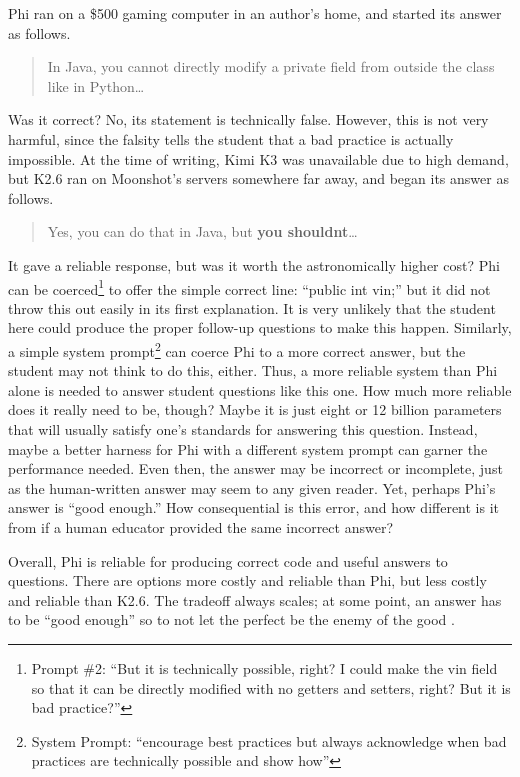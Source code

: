 Phi ran on a \$500 gaming computer in an author's home, and started its answer as follows.

\begin{quote}
In Java, you cannot directly modify a private field from outside the class like in Python\ldots{}
\end{quote}

Was it correct? No, its statement is technically false. However, this is not very harmful, since the falsity tells the student that a bad practice is actually impossible. At the time of writing, Kimi K3 was unavailable due to high demand, but K2.6 ran on Moonshot's servers somewhere far away, and began its answer as follows.

\begin{quote}
Yes, you can do that in Java, but \textbf{you shouldn\textquotesingle t}\ldots{}
\end{quote}

It gave a reliable response, but was it worth the astronomically higher cost? Phi can be coerced\footnote{Prompt \#2: ``But it is technically possible, right? I could make the vin field so that it can be directly modified with no getters and setters, right? But it is bad practice?''} to offer the simple correct line: ``public int vin;'' but it did not throw this out easily in its first explanation. It is very unlikely that the student here could produce the proper follow-up questions to make this happen. Similarly, a simple system prompt\footnote{System Prompt: ``encourage best practices but always acknowledge when bad practices are technically possible and show how''} can coerce Phi to a more correct answer, but the student may not think to do this, either. Thus, a more reliable system than Phi alone is needed to answer student questions like this one. How much more reliable does it really need to be, though? Maybe it is just eight or 12 billion parameters that will usually satisfy one's standards for answering this question. Instead, maybe a better harness for Phi with a different system prompt can garner the performance needed. Even then, the answer may be incorrect or incomplete, just as the human-written answer may seem to any given reader. Yet, perhaps Phi's answer is ``good enough.'' How consequential is this error, and how different is it from if a human educator provided the same incorrect answer?

Overall, Phi is reliable for producing correct code and useful answers to questions. There are options more costly and reliable than Phi, but less costly and reliable than K2.6. The tradeoff always scales; at some point, an answer has to be ``good enough'' so to not let the perfect be the enemy of the good \cite{dingHybridLlmCostefficient2024}.

